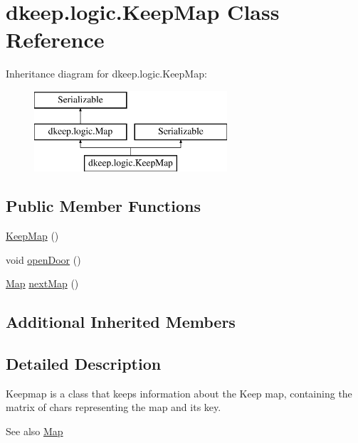 \hypertarget{classdkeep_1_1logic_1_1_keep_map}{}\section{dkeep.\+logic.\+Keep\+Map Class Reference}
\label{classdkeep_1_1logic_1_1_keep_map}
Inheritance diagram for dkeep.\+logic.\+Keep\+Map\+:\begin{figure}[H]
\begin{center}
\leavevmode
\includegraphics[height=3.000000cm]{classdkeep_1_1logic_1_1_keep_map}
\end{center}
\end{figure}
\subsection*{Public Member Functions}
\begin{DoxyCompactItemize}
\item 
\hyperlink{classdkeep_1_1logic_1_1_keep_map_a77443022f5af921bd511f4175a5adb6d}{Keep\+Map} ()
\item 
void \hyperlink{classdkeep_1_1logic_1_1_keep_map_a912c774ff749f78b0cf59509d0411a5c}{open\+Door} ()
\item 
\hyperlink{classdkeep_1_1logic_1_1_map}{Map} \hyperlink{classdkeep_1_1logic_1_1_keep_map_aee65a7c7233c2433140de2c97d989d4b}{next\+Map} ()
\end{DoxyCompactItemize}
\subsection*{Additional Inherited Members}


\subsection{Detailed Description}
Keepmap is a class that keeps information about the Keep map, containing the matrix of chars representing the map and it\textquotesingle{}s key. \begin{DoxySeeAlso}{See also}
\hyperlink{classdkeep_1_1logic_1_1_map}{Map} 
\end{DoxySeeAlso}


